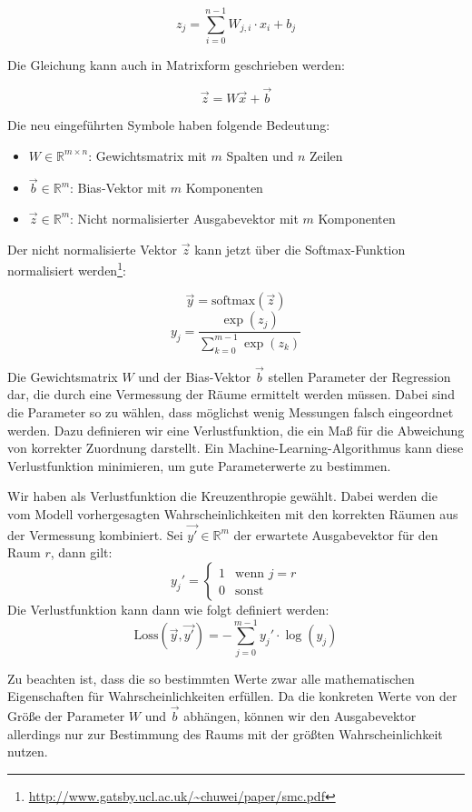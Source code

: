 $$ z_j = \sum_{i=0}^{n-1} W_{j,i} \cdot x_i + b_j $$

Die Gleichung kann auch in Matrixform geschrieben werden:

$$ \vec{z} = W \vec{x} + \vec{b} $$

Die neu eingeführten Symbole haben folgende Bedeutung:
\begin{itemize}
	\item $W \in \mathbb{R}^{m \times n}$: Gewichtsmatrix mit $m$ Spalten und $n$ Zeilen
	\item $\vec{b} \in \mathbb{R}^m$: Bias-Vektor mit $m$ Komponenten
	\item $\vec{z} \in \mathbb{R}^m$: Nicht normalisierter Ausgabevektor mit $m$ Komponenten
\end{itemize}

Der nicht normalisierte Vektor $\vec{z}$ kann jetzt über die Softmax-Funktion normalisiert
werden\footnote{\url{http://www.gatsby.ucl.ac.uk/~chuwei/paper/smc.pdf}}:

$$ \vec{y} = \text{softmax}(\vec{z}) $$
$$ y_j = \frac{\exp(z_j)}{\sum_{k=0}^{m-1} \exp(z_k) } $$

Die Gewichtsmatrix $W$ und der Bias-Vektor $\vec{b}$ stellen Parameter der Regression dar,
die durch eine Vermessung der Räume ermittelt werden müssen. Dabei sind die Parameter so
zu wählen, dass möglichst wenig Messungen falsch eingeordnet werden. Dazu definieren wir
eine Verlustfunktion, die ein Maß für die Abweichung von korrekter Zuordnung darstellt.
Ein Machine-Learning-Algorithmus kann diese Verlustfunktion minimieren, um
gute Parameterwerte zu bestimmen.

Wir haben als Verlustfunktion die Kreuzenthropie gewählt. Dabei werden die vom Modell vorhergesagten
Wahrscheinlichkeiten mit den korrekten Räumen aus der Vermessung kombiniert.
Sei $\vec{y'} \in \mathbb{R}^m$ der erwartete Ausgabevektor für den Raum $r$, dann gilt:
\[
y_j' = 
\begin{cases}
	1 & \text{wenn } j = r  \\ 
	0 & \text{sonst}
\end{cases}
\]
Die Verlustfunktion kann dann wie folgt definiert werden:
$$ \text{Loss}(\vec{y}, \vec{y'}) = - \sum_{j=0}^{m-1} y_j' \cdot \log(y_j) $$

Zu beachten ist, dass die so bestimmten Werte zwar alle mathematischen
Eigenschaften für Wahrscheinlichkeiten erfüllen. Da die konkreten Werte von der
Größe der Parameter $W$ und $\vec{b}$ abhängen, können wir den Ausgabevektor
allerdings nur zur Bestimmung des Raums mit der größten Wahrscheinlichkeit nutzen.

